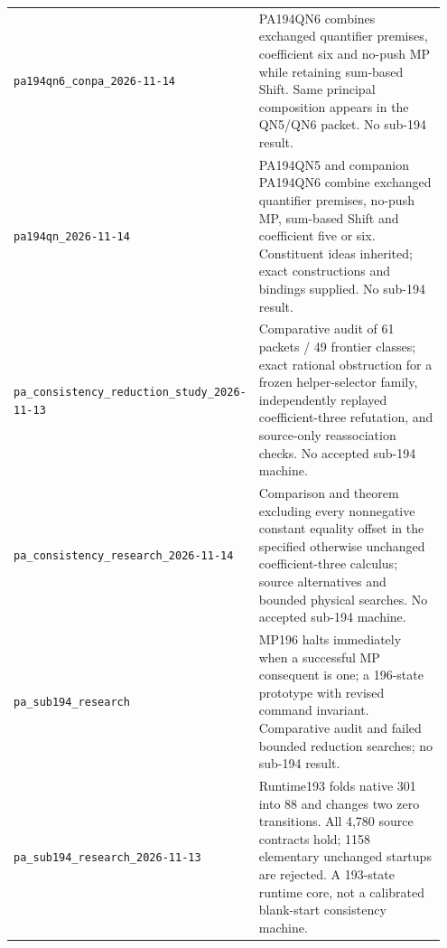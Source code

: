 \begin{longtable}{@{}>{\raggedright\arraybackslash}p{0.36\linewidth}>{\raggedright\arraybackslash}p{0.59\linewidth}@{}}
\nolinkurl{pa194qn6_conpa_2026-11-14} & PA194QN6 combines exchanged quantifier premises, coefficient six and no-push MP while retaining sum-based Shift. Same principal composition appears in the QN5/QN6 packet. No sub-194 result.\\[4pt]
\nolinkurl{pa194qn_2026-11-14} & PA194QN5 and companion PA194QN6 combine exchanged quantifier premises, no-push MP, sum-based Shift and coefficient five or six. Constituent ideas inherited; exact constructions and bindings supplied. No sub-194 result.\\[4pt]
\nolinkurl{pa_consistency_reduction_study_2026-11-13} & Comparative audit of 61 packets / 49 frontier classes; exact rational obstruction for a frozen helper-selector family, independently replayed coefficient-three refutation, and source-only reassociation checks. No accepted sub-194 machine.\\[4pt]
\nolinkurl{pa_consistency_research_2026-11-14} & Comparison and theorem excluding every nonnegative constant equality offset in the specified otherwise unchanged coefficient-three calculus; source alternatives and bounded physical searches. No accepted sub-194 machine.\\[4pt]
\nolinkurl{pa_sub194_research} & MP196 halts immediately when a successful MP consequent is one; a 196-state prototype with revised command invariant. Comparative audit and failed bounded reduction searches; no sub-194 result.\\[4pt]
\nolinkurl{pa_sub194_research_2026-11-13} & Runtime193 folds native 301 into 88 and changes two zero transitions. All 4,780 source contracts hold; 1158 elementary unchanged startups are rejected. A 193-state runtime core, not a calibrated blank-start consistency machine.\\[4pt]
\bottomrule
\end{longtable}
